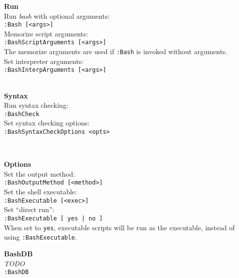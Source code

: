 \documentclass[oneside,11pt,landscape,DIV16]{scrartcl}
\begin{document}
\begin{multicols}{3}
\begin{center}
{\large{\textbf{Run}}\\[1.0ex]
Run \textit{bash} with optional arguments: \\[0.5ex]
\texttt{:Bash [<args>]} \\[1.0ex]
Memorize script arguments: \\[0.5ex]
\texttt{:BashScriptArguments [<args>]} \\[0.5ex]
The memorize arguments are used if \texttt{:Bash} is invoked without arguments. \\[1.0ex]
Set interpreter arguments: \\[0.5ex]
\texttt{:BashInterpArguments [<args>]} \\[2.5ex]
%
}\\%
%
\parbox[t][42mm][t]{69mm}{%
\large{\textbf{Syntax}}\\[1.0ex]
Run syntax checking: \\[0.5ex]
\texttt{:BashCheck} \\[1.0ex]
Set syntax checking options: \\[0.5ex]
\texttt{:BashSyntaxCheckOptions <opts>} \\[2.5ex]
%
}\\%
%
\parbox[t][72mm][t]{69mm}{%
\large{\textbf{Options}}\\[1.0ex]
Set the output method: \\[0.5ex]
\texttt{:BashOutputMethod [<method>]} \\[1.0ex]
Set the shell executable: \\[0.5ex]
\texttt{:BashExecutable [<exec>]} \\[1.0ex]
Set ``direct run'': \\[0.5ex]
\texttt{:BashExecutable [ yes | no ]} \\[0.5ex]
When set to \texttt{yes}, executable scripts will be run as the executable, instead of using \texttt{:BashExecutable}. \\[1.0ex]
}
%
\parbox[t][72mm][t]{69mm}{%
\large{\textbf{BashDB}}\\[1.0ex]
\textit{TODO} \\[0.5ex]
\texttt{:BashDB} \\[1.0ex]
}
%
\end{center}%
\end{multicols}%
%
\end{document}
